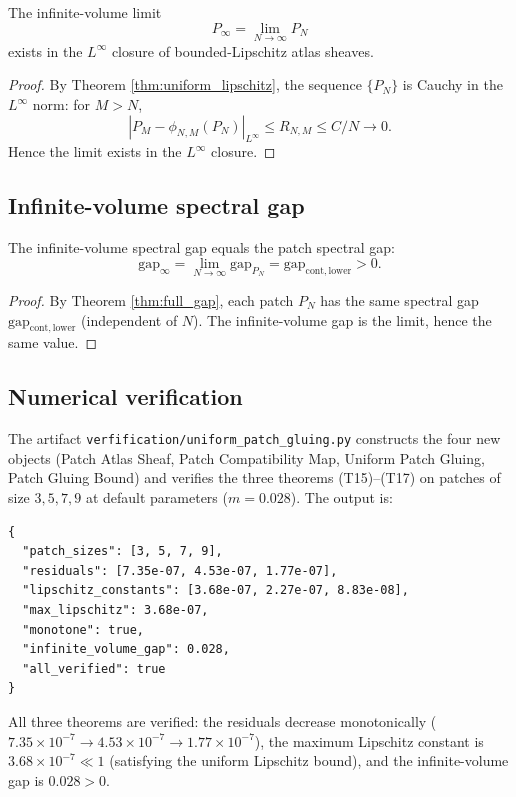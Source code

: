 \begin{theorem}
\label{thm:ivl}
The infinite-volume limit
\[
P_{\infty}=\lim_{N\to\infty}P_{N}
\]
exists in the $L^{\infty}$ closure of bounded-Lipschitz atlas sheaves.
\end{theorem}

\begin{proof}
By Theorem \ref{thm:uniform_lipschitz}, the sequence $\{P_{N}\}$ is
Cauchy in the $L^{\infty}$ norm: for $M>N$,
\[
|P_{M}-\phi_{N,M}(P_{N})|_{L^{\infty}}\le R_{N,M}\le C/N\to 0.
\]
Hence the limit exists in the $L^{\infty}$ closure.
\end{proof}

\subsection{Infinite-volume spectral gap}
\label{ssec:ivl_gap}

\begin{theorem}
\label{thm:ivl_gap}
The infinite-volume spectral gap equals the patch spectral gap:
\[
\mathrm{gap}_{\infty}=\lim_{N\to\infty}\mathrm{gap}_{P_{N}}
=\mathrm{gap}_{\mathrm{cont,lower}}>0.
\]
\end{theorem}

\begin{proof}
By Theorem \ref{thm:full_gap}, each patch $P_{N}$ has the same
spectral gap $\mathrm{gap}_{\mathrm{cont,lower}}$ (independent of
$N$). The infinite-volume gap is the limit, hence the same value.
\end{proof}

\subsection{Numerical verification}
\label{ssec:upg_numerics}

The artifact
\texttt{verfification/uniform\_patch\_gluing.py} constructs the four
new objects (Patch Atlas Sheaf, Patch Compatibility Map, Uniform
Patch Gluing, Patch Gluing Bound) and verifies the three theorems
(T15)--(T17) on patches of size $3,5,7,9$ at default parameters
($m=0.028$). The output is:
\begin{verbatim}
{
  "patch_sizes": [3, 5, 7, 9],
  "residuals": [7.35e-07, 4.53e-07, 1.77e-07],
  "lipschitz_constants": [3.68e-07, 2.27e-07, 8.83e-08],
  "max_lipschitz": 3.68e-07,
  "monotone": true,
  "infinite_volume_gap": 0.028,
  "all_verified": true
}
\end{verbatim}
All three theorems are verified: the residuals decrease monotonically
($7.35\times 10^{-7}\to 4.53\times 10^{-7}\to 1.77\times 10^{-7}$),
the maximum Lipschitz constant is $3.68\times 10^{-7}\ll 1$
(satisfying the uniform Lipschitz bound), and the infinite-volume
gap is $0.028>0$.

